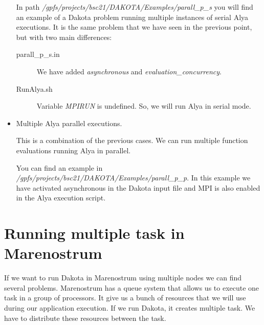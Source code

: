 \documentclass[12pt,a4paper,article]{memoir}
\begin{document}
\begin{itemize}
In path \textit{/gpfs/projects/bsc21/DAKOTA/Examples/parall\_p\_s} you will find an example of a Dakota problem running multiple instances of serial Alya executions. It is the same problem that we have seen in the previous point, but with two main differences:
\begin{description}
\item[parall\_p\_s.in] We have added \textit{asynchronous} and \textit{evaluation\_concurrency}.
\item[RunAlya.sh] Variable \textit{MPIRUN} is undefined. So, we will run Alya in serial mode.
\end{description}

\item Multiple Alya parallel executions.

This is a combination of the previous cases. We can run multiple function evaluations running Alya in parallel.

You can find an example in \textit{/gpfs/projects/bsc21/DAKOTA/Examples/parall\_p\_p}. In this example we have activated asynchronous in the Dakota input file and MPI is also enabled in the Alya execution script.

\end{itemize}

\section{Running multiple task in Marenostrum}

If we want to run Dakota in Marenostrum using multiple nodes we can find several problems. Marenostrum has a queue system that allows us to execute one task in a group of processors. It give us a bunch of resources that we will use during our application execution. If we run Dakota, it creates multiple task. We have to distribute these resources between the task.
\end{document}
